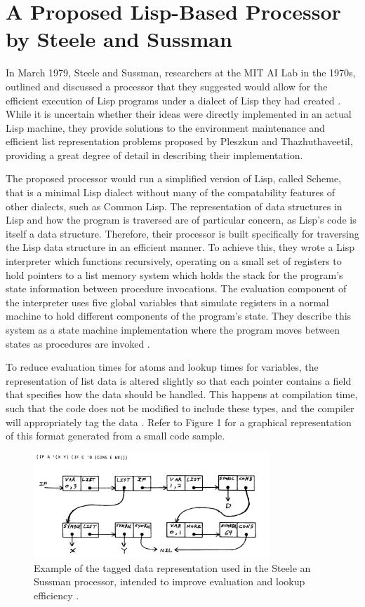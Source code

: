 \documentclass[journal]{IEEEtran}
\begin{document}
\section{A Proposed Lisp-Based Processor by Steele and Sussman}
In March 1979, Steele and Sussman, researchers at the MIT AI Lab in the 1970s, outlined and discussed a processor that they suggested would allow for the efficient execution of Lisp programs under a dialect of Lisp they had created \cite{ss}. While it is uncertain whether their ideas were directly implemented in an actual Lisp machine, they provide solutions to the environment maintenance and efficient list representation problems proposed by Pleszkun and Thazhuthaveetil, providing a great degree of detail in describing their implementation.

The proposed processor would run a simplified version of Lisp, called Scheme, that is a minimal Lisp dialect without many of the compatability features of other dialects, such as Common Lisp. The representation of data structures in Lisp and how the program is traversed are of particular concern, as Lisp's code is itself a data structure. Therefore, their processor is built specifically for traversing the Lisp data structure in an efficient manner. To achieve this, they wrote a Lisp interpreter which functions recursively, operating on a small set of registers to hold pointers to a list memory system which holds the stack for the program's state information between procedure invocations. The evaluation component of the interpreter uses five global variables that simulate registers in a normal machine to hold different components of the program's state. They describe this system as a state machine implementation where the program moves between states as procedures are invoked \cite{ss}.

To reduce evaluation times for atoms and lookup times for variables, the representation of list data is altered slightly so that each pointer contains a field that specifies how the data should be handled. This happens at compilation time, such that the code does not be modified to include these types, and the compiler will appropriately tag the data \cite{ss}. Refer to Figure 1 for a graphical representation of this format generated from a small code sample.

\begin{figure}[!t]
	\centering
	\includegraphics[width=3.5in]{SS_Data_Representation}
	\caption{Example of the tagged data representation used in the Steele an Sussman processor, intended to improve evaluation and lookup efficiency \cite{ss}.}
	\label{Data representation}
\end{figure}
\end{document}
